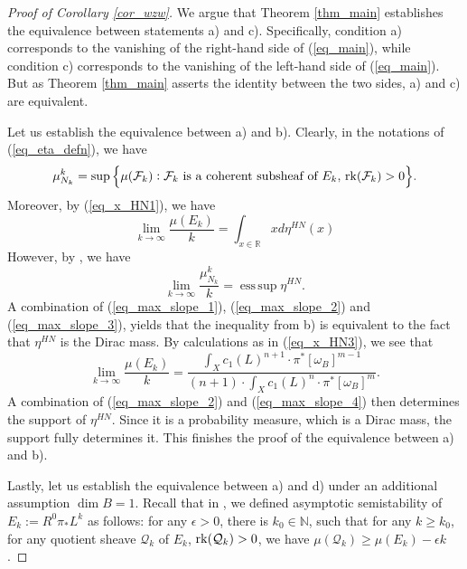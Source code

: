 \documentclass[12pt]{article}
\numberwithin{equation}{section}
\theoremstyle{theorem}
\theoremstyle{definition}
\theoremstyle{remark}
\newcommand{\real}{\mathbb{R}}
\newcommand{\nat}{\mathbb{N}}
\newcommand{\rk}[1]{{\rm{rk}} ( #1 )}
\DeclareMathOperator*{\esssup}{ess\,sup}
\begin{document}
	\begin{proof}[Proof of Corollary \ref{cor_wzw}]
		We argue that Theorem \ref{thm_main} establishes the equivalence between statements a) and c). 
		Specifically, condition a) corresponds to the vanishing of the right-hand side of (\ref{eq_main}), while condition c) corresponds to the vanishing of the left-hand side of (\ref{eq_main}).
		But as Theorem \ref{thm_main} asserts the identity between the two sides, a) and c) are equivalent.
		\par 
		Let us establish the equivalence between a) and b).
		Clearly, in the notations of (\ref{eq_eta_defn}), we have
		\begin{equation}\label{eq_max_slope_1}
			\mu_{N_k}^k
			=
			\sup
			\Big\{
				\mu(\mathcal{F}_k) : \mathcal{F}_k \text{ is a coherent subsheaf of } E_k, \, \rk{\mathcal{F}_k} > 0
			\Big\}.
		\end{equation}
		Moreover, by (\ref{eq_x_HN1}), we have
		\begin{equation}\label{eq_max_slope_2}
			\lim_{k \to \infty} \frac{\mu(E_k)}{k}
			=
			\int_{x \in \real} x d \eta^{HN}(x)
		\end{equation}
		However, by \cite[Theorem 1.1]{FinHNI}, we have 
		\begin{equation}\label{eq_max_slope_3}
			\lim_{k \to \infty} \frac{\mu_{N_k}^k}{k} =  \esssup \eta^{HN}.
		\end{equation}
		A combination of (\ref{eq_max_slope_1}), (\ref{eq_max_slope_2}) and (\ref{eq_max_slope_3}), yields that the inequality from b) is equivalent to the fact that $\eta^{HN}$ is the Dirac mass.
		By calculations as in (\ref{eq_x_HN3}), we see that
		\begin{equation}\label{eq_max_slope_4}
			\lim_{k \to \infty} \frac{\mu(E_k)}{k}
			=
			\frac{\int_X c_1(L)^{n + 1} \cdot \pi^* [\omega_B]^{m - 1} }{(n + 1) \cdot \int_X c_1(L)^n \cdot \pi^* [\omega_B]^m}.
		\end{equation}
		A combination of (\ref{eq_max_slope_2}) and (\ref{eq_max_slope_4}) then determines the support of $\eta^{HN}$.
		Since it is a probability measure, which is a Dirac mass, the support fully determines it. This finishes the proof of the equivalence between a) and b).
		\par 
		Lastly, let us establish the equivalence between a) and d) under an additional assumption $\dim B = 1$.
		Recall that in \cite{FinHNII}, we defined asymptotic semistability of $E_k := R^0 \pi_* L^k$ as follows: for any $\epsilon > 0$, there is $k_0 \in \nat$, such that for any $k \geq k_0$, for any quotient sheave $\mathcal{Q}_k$ of $E_k$, $\rk{\mathcal{Q}_k} > 0$, we have $\mu(\mathcal{Q}_k) \geq \mu(E_k) - \epsilon k$.

\end{proof}
\end{document}
